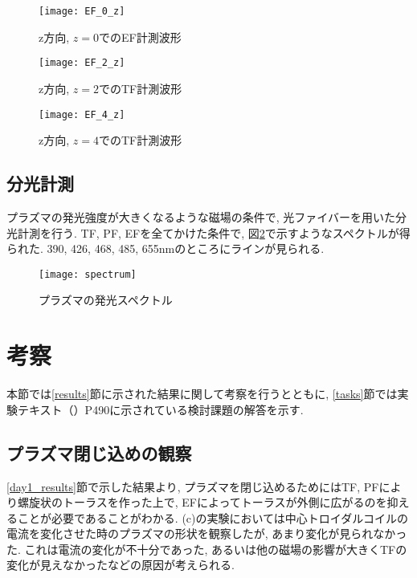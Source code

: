 \documentclass[]{jsarticle}
\begin{document}
	\begin{figure}[htbp]
	
		\begin{minipage}{0.33\hsize}
			\begin{center}
				\texttt{[image: EF\_0\_z]}
				\caption{z方向, $z = 0$でのEF計測波形}
				\label{EF_0_z^}
			\end{center}
		\end{minipage}
		\begin{minipage}{0.33\hsize}
			\begin{center}
				\texttt{[image: EF\_2\_z]}
				\caption{z方向, $z = 2$でのTF計測波形}
				\label{EF_2_z}
			\end{center}
		\end{minipage}
		\begin{minipage}{0.33\hsize}
			\begin{center}
				\texttt{[image: EF\_4\_z]}
				\caption{z方向, $z = 4$でのTF計測波形}
				\label{EF_4_z}
			\end{center}
		\end{minipage}
		
	\end{figure}
		
	\subsection{分光計測\label{bunko_results}}
	プラズマの発光強度が大きくなるような磁場の条件で, 光ファイバーを用いた分光計測を行う. TF, PF, EFを全てかけた条件で, 図\ref{spectrum}で示すようなスペクトルが得られた. 390, 426, 468, 485, 655nmのところにラインが見られる. 
	
	\begin{figure}[htbp]
	\begin{center}
	\texttt{[image: spectrum]}
	\caption{プラズマの発光スペクトル}
	\label{spectrum}
	\end{center}
	\end{figure}
		
	
\section{考察\label{consideration}}
	本節では\ref{results}節に示された結果に関して考察を行うとともに, \ref{tasks}節では実験テキスト（\cite{t}）P490に示されている検討課題の解答を示す. 
	\subsection{プラズマ閉じ込めの観察}
		\ref{day1_results}節で示した結果より, プラズマを閉じ込めるためにはTF, PFにより螺旋状のトーラスを作った上で, EFによってトーラスが外側に広がるのを抑えることが必要であることがわかる. (c)の実験においては中心トロイダルコイルの電流を変化させた時のプラズマの形状を観察したが, あまり変化が見られなかった. これは電流の変化が不十分であった, あるいは他の磁場の影響が大きくTFの変化が見えなかったなどの原因が考えられる. 
\end{document}
